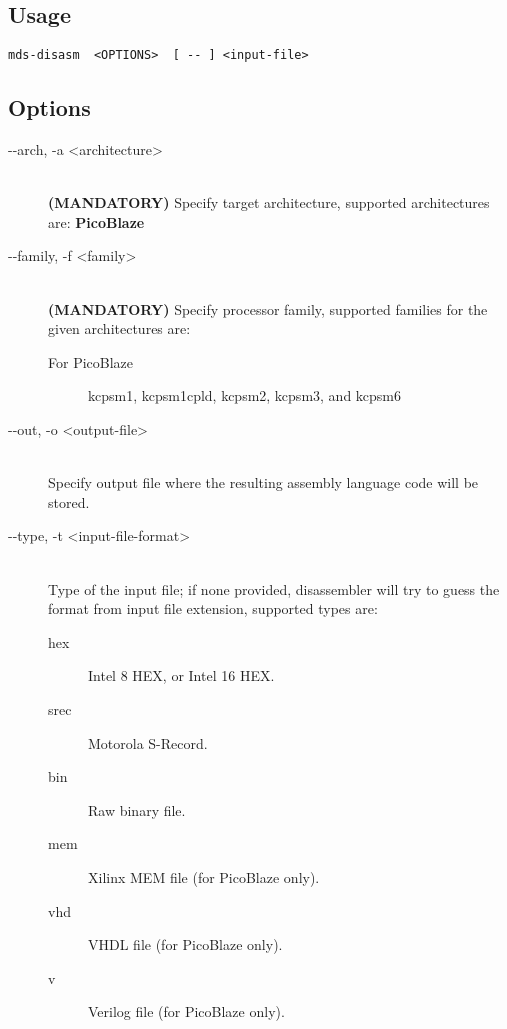     \subsection{Usage}
        \verb'mds-disasm  <OPTIONS>  [ -- ] <input-file>'

    \subsection{Options}
        \begin{description}
            \item[-{}-arch, -a <architecture>]~\\
                \textbf{(MANDATORY)} Specify target architecture, supported architectures are: \textbf{PicoBlaze}

            \item[-{}-family, -f <family>]~\\
                \textbf{(MANDATORY)} Specify processor family, supported families for the given architectures are:
                \begin{description}
                    \item[For PicoBlaze]
                        kcpsm1, kcpsm1cpld, kcpsm2, kcpsm3, and kcpsm6
                \end{description}

            \item[-{}-out, -o <output-file>]~\\
                Specify output file where the resulting assembly language code will be stored.

            \item[-{}-type, -t <input-file-format>]~\\
                Type of the input file; if none provided, disassembler will try to guess the format from input file extension, supported types are:
                \begin{description}
                    \item [hex] Intel 8 HEX, or Intel 16 HEX.
                    \item [srec] Motorola S-Record.
                    \item [bin] Raw binary file.
                    \item [mem] Xilinx MEM file (for PicoBlaze only).
                    \item [vhd] VHDL file (for PicoBlaze only).
                    \item [v] Verilog file (for PicoBlaze only).
                \end{description}


\end{description}
